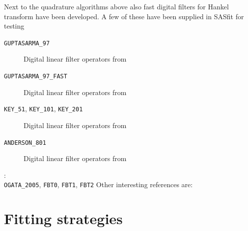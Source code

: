 Next to the quadrature algorithms above also fast digital filters for Hankel transform have been developed. A few of these have been supplied in SASfit for testing
\begin{description}
\item[\texttt{GUPTASARMA\_97}] Digital linear filter operators from \cite{Guptasarma1997}
\item[\texttt{GUPTASARMA\_97\_FAST}] Digital linear filter operators from \cite{Guptasarma1997}
\item[\texttt{KEY\_51}, \texttt{KEY\_101}, \texttt{KEY\_201}] Digital linear filter operators from \cite{Key2012,Werthmueller2019}
\item[\texttt{ANDERSON\_801}] Digital linear filter operators from \cite{Anderson1989,Werthmueller2019}
\end{description}
\cite{Ogata2005,Kong2007,Kang2021}: \\
\texttt{OGATA\_2005}, \texttt{FBT0}, \texttt{FBT1}, \texttt{FBT2}
Other interesting references are: \cite{GuizarSicairos2004,Diehl2024a,Diehl2024,Malinka2021,Baddour2017}

\clearpage
\section{Fitting strategies}
